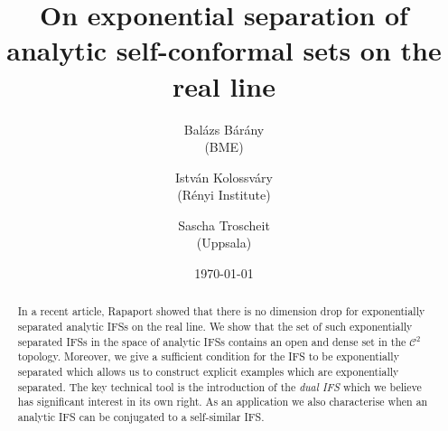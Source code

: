 \documentclass[11pt,a4paper]{article}
\title{On exponential separation of analytic self-conformal sets on the real line}
\author{Bal\'azs B\'ar\'any\\(BME) \and Istv\'an
  Kolossv\'ary\\ (R\'enyi Institute) \and Sascha
Troscheit \\(Uppsala)}
\date{\today}
\theoremstyle{definition}
\theoremstyle{remark}
\newcommand{\0}{\mathbf{0}}
\numberwithin{equation}{section}
\begin{document}
\frenchspacing
\maketitle


\begin{abstract}
In a recent article, Rapaport showed that there is no dimension drop for
exponentially separated analytic IFSs on the real line. We show that the set of such exponentially
separated IFSs in the space of analytic IFSs contains an open and dense set in the $\mathcal{C}^2$
topology. Moreover, we give a sufficient condition for the IFS to be exponentially separated which
allows us to construct explicit examples which are exponentially separated. The key
technical tool is the introduction of the \emph{dual IFS} which we believe has significant interest
in its own right. As an application we also characterise when an analytic IFS can be conjugated to a
self-similar IFS. 
\end{abstract}


%
%

\end{document}
